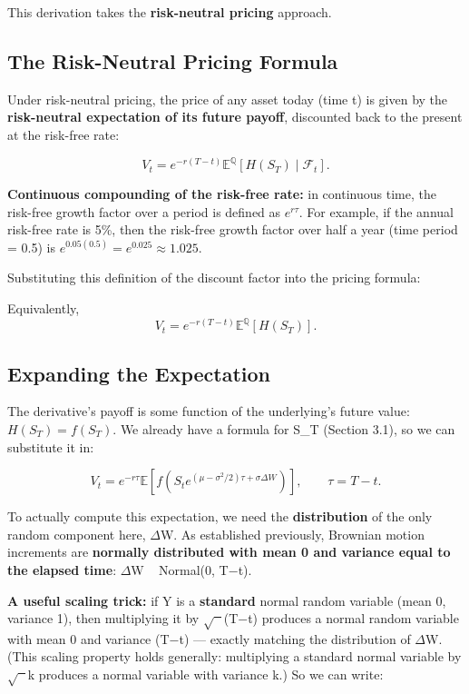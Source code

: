 \documentclass[12pt,openany]{book}
\theoremstyle{definition}
\theoremstyle{remark}
\newcommand{\E}{\mathbb{E}}
\newcommand{\Fscr}{\mathcal{F}}
\begin{document}
This derivation takes the \textbf{risk-neutral pricing} approach.

\subsection{The Risk-Neutral Pricing Formula}

Under risk-neutral pricing, the price of any asset today (time t) is given by the \textbf{risk-neutral expectation of its future payoff}, discounted back to the present at the risk-free rate:

\[V_t=e^{-r(T-t)}\E^{\mathbb Q}[H(S_T)\mid\Fscr_t].\]

\textbf{Continuous compounding of the risk-free rate:} in continuous time, the risk-free growth factor over a period is defined as \(e^{r\tau}\). For example, if the annual risk-free rate is 5\%, then the risk-free growth factor over half a year (time period = 0.5) is \(e^{0.05(0.5)}=e^{0.025}\approx1.025\).

Substituting this definition of the discount factor into the pricing formula:

Equivalently,
\[
V_t=e^{-r(T-t)}\E^{\mathbb Q}[H(S_T)].
\]

\subsection{Expanding the Expectation}

The derivative's payoff is some function of the underlying's future value: \(H(S_T)=f(S_T)\). We already have a formula for S\_T (Section 3.1), so we can substitute it in:

\[
V_t=e^{-r\tau}\E\!\left[f\!\left(S_t e^{(\mu-\sigma^2/2)\tau+\sigma\Delta W}\right)\right],
\qquad \tau=T-t.
\]

To actually compute this expectation, we need the \textbf{distribution} of the only random component here, \(\Delta\)W. As established previously, Brownian motion increments are \textbf{normally distributed with mean 0 and variance equal to the elapsed time}: \(\Delta\)W ~ Normal(0, T\(-\)t).

\textbf{A useful scaling trick:} if Y is a \textbf{standard} normal random variable (mean 0, variance 1), then multiplying it by \(\sqrt{\phantom{x}}\)(T\(-\)t) produces a normal random variable with mean 0 and variance (T\(-\)t) --- exactly matching the distribution of \(\Delta\)W. (This scaling property holds generally: multiplying a standard normal variable by \(\sqrt{\phantom{x}}\)k produces a normal variable with variance k.) So we can write:
\end{document}
